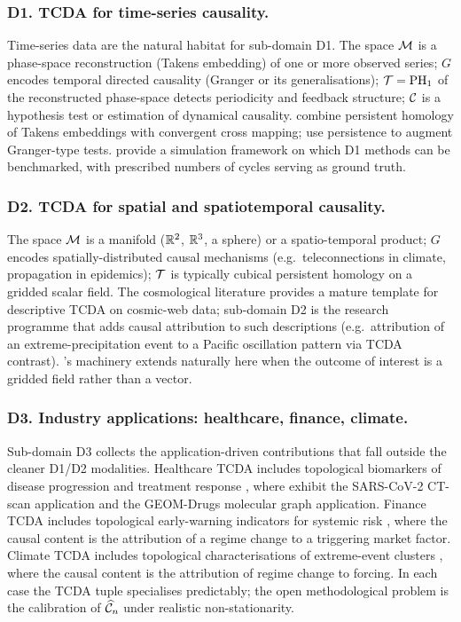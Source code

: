 \subsubsection*{D1. TCDA for time-series causality.}
Time-series data are the natural habitat for sub-domain D1. The space
$\mathcal{M}$ is a phase-space reconstruction (Takens embedding) of one or more
observed series; $G$ encodes temporal directed causality (Granger or
its generalisations); $\mathcal{T} = \mathrm{PH}_{1}$ of the reconstructed phase-space
detects periodicity and feedback structure; $\mathcal{C}$ is a hypothesis test
or estimation of dynamical causality. \citet{bando2022causal} combine
persistent homology of Takens embeddings with convergent cross mapping;
\citet{harnack2017causal,gholizadeh2018short} use persistence to
augment Granger-type tests. \citet{elyaagoubi2023statistical} provide a
simulation framework on which D1 methods can be benchmarked, with
prescribed numbers of cycles serving as ground truth.

\subsubsection*{D2. TCDA for spatial and spatiotemporal causality.}
The space $\mathcal{M}$ is a manifold ($\mathbb{R}^2$, $\mathbb{R}^3$, a sphere) or a
spatio-temporal product; $G$ encodes spatially-distributed causal
mechanisms (e.g.\ teleconnections in climate, propagation in epidemics);
$\mathcal{T}$ is typically cubical persistent homology
\citep{kaczynski2004computational} on a gridded scalar field. The
cosmological literature \citep{sousbie2011persistent,
vandeweygaert2011alpha,cisewski2014nonparametric} provides a mature
template for descriptive TCDA on cosmic-web data; sub-domain D2 is the
research programme that adds causal attribution to such descriptions
(e.g.\ attribution of an extreme-precipitation event to a Pacific
oscillation pattern via TCDA contrast). \citet{kim2026topological}'s
machinery extends naturally here when the outcome of interest is a
gridded field rather than a vector.

\subsubsection*{D3. Industry applications: healthcare, finance, climate.}
Sub-domain D3 collects the application-driven contributions that fall
outside the cleaner D1/D2 modalities. Healthcare TCDA includes
topological biomarkers of disease progression and treatment response
\citep{kovacev2016using,cang2018integration,iqbal2025classification,
soares2020sars,kim2018topological}, where \citet{kim2026topological}
exhibit the SARS-CoV-2 CT-scan application and the GEOM-Drugs molecular
graph application. Finance TCDA includes topological early-warning
indicators for systemic risk \citep{gidea2018topological,
ismail2022early}, where the causal content is the attribution of a
regime change to a triggering market factor. Climate TCDA includes
topological characterisations of extreme-event clusters
\citep{cisewski2014nonparametric,strommen2025topological}, where the
causal content is the attribution of regime change to forcing. In each
case the TCDA tuple specialises predictably; the open methodological
problem is the calibration of $\widehat{\mathcal{C}}_n$ under realistic
non-stationarity.

